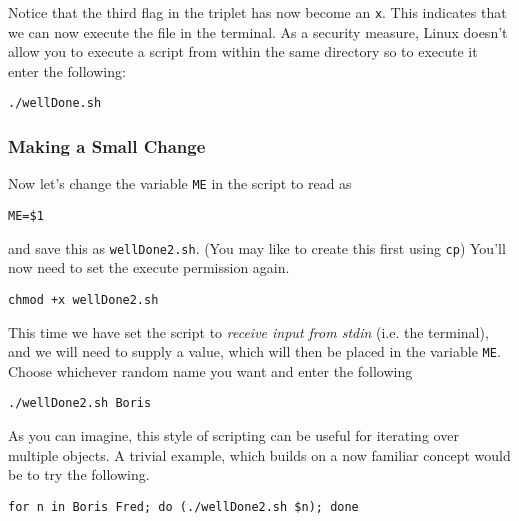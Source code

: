 \begin{steps}
Notice that the third flag in the triplet has now become an \texttt{x}.
This indicates that we can now execute the file in the terminal.
As a security measure, Linux doesn't allow you to execute a script from within the same directory so
to execute it enter the following:
\begin{lstlisting}
./wellDone.sh
\end{lstlisting}
\end{steps}

\subsubsection{Making a Small Change}

\begin{steps}
Now let's change the variable \texttt{ME} in the script to read as
\begin{lstlisting}
ME=$1
\end{lstlisting}
and save this as \texttt{wellDone2.sh}.
(You may like to create this first using \texttt{cp})
You'll now need to set the execute permission again.
\begin{lstlisting}
chmod +x wellDone2.sh
\end{lstlisting}
\end{steps}

\begin{information}
This time we have set the script to \textit{receive input from stdin} (i.e. the terminal), and we
will need to supply a value, which will then be placed in the variable \texttt{ME}.
Choose whichever random name you want and enter the following
\begin{lstlisting}
./wellDone2.sh Boris
\end{lstlisting}
\end{information}

\begin{advanced}
As you can imagine, this style of scripting can be useful for iterating over multiple objects.
A trivial example, which builds on a now familiar concept would be to try the following.
\begin{lstlisting}
for n in Boris Fred; do (./wellDone2.sh $n); done
\end{lstlisting}
\end{advanced}

